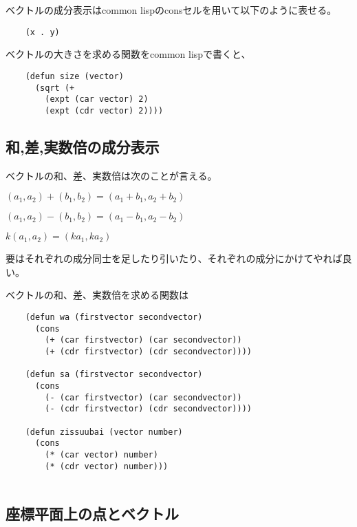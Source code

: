 \documentclass[a4paper]{jsarticle}
\begin{document}
\begin{boxnote}
  ベクトルの成分表示はcommon lispのconsセルを用いて以下のように表せる。\par
  \begin{lstlisting}
    (x . y)
  \end{lstlisting}

  ベクトルの大きさを求める関数をcommon lispで書くと、\par
  \begin{lstlisting}
    (defun size (vector)
      (sqrt (+
        (expt (car vector) 2)
        (expt (cdr vector) 2))))
  \end{lstlisting}
\end{boxnote}

\subsection*{和,差,実数倍の成分表示}

ベクトルの和、差、実数倍は次のことが言える。
\begin{screen}
  $(a_1, a_2)+(b_1, b_2)=(a_1+b_1, a_2+b_2)$\par
  $(a_1, a_2)-(b_1, b_2)=(a_1-b_1, a_2-b_2)$\par
  $k(a_1, a_2)=(ka_1, ka_2)$\par
\end{screen}
要はそれぞれの成分同士を足したり引いたり、それぞれの成分にかけてやれば良い。

\begin{boxnote}
  ベクトルの和、差、実数倍を求める関数は
  \begin{lstlisting}
    (defun wa (firstvector secondvector)
      (cons
        (+ (car firstvector) (car secondvector))
        (+ (cdr firstvector) (cdr secondvector))))

    (defun sa (firstvector secondvector)
      (cons
        (- (car firstvector) (car secondvector))
        (- (cdr firstvector) (cdr secondvector))))

    (defun zissuubai (vector number)
      (cons
        (* (car vector) number)
        (* (cdr vector) number)))
    
  \end{lstlisting}  
\end{boxnote}

\subsection*{座標平面上の点とベクトル}
\end{document}

